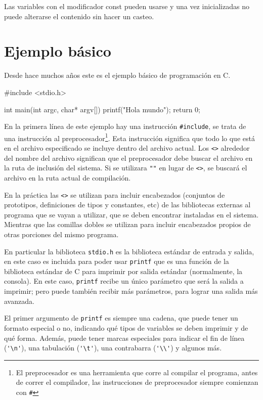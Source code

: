 Las variables con el modificador const pueden usarse y una vez inicializadas
no puede alterarse el contenido sin hacer un casteo.

\section{Ejemplo básico}

Desde hace muchos años este es el ejemplo básico de programación en C.

\begin{codigo-c}
#include <stdio.h>

int main(int argc, char* argv[])
{
    printf("Hola mundo\n");
    return 0;
}
\end{codigo-c}

En la primera línea de este ejemplo hay una instrucción \lstinline!#include!,
se trata de una instrucción al preprocesador\footnote{El preprocesador es una
herramienta que corre al compilar el programa, antes de correr el compilador,
las instrucciones de preprocesador siempre comienzan con \lstinline!#!}.
Esta instrucción significa que todo lo que está en el archivo especificado se
incluye dentro del archivo actual. Los \lstinline!<>! alrededor del nombre del
archivo significan que el preprocesador debe buscar el archivo en la ruta de
inclusión del sistema.  Si se utilizara \lstinline!""! en lugar de
\lstinline!<>!, se buscará el archivo en la ruta actual de compilación.

En la práctica las \lstinline!<>! se utilizan para incluir encabezados
(conjuntos de prototipos, definiciones de tipos y constantes, etc) de las
bibliotecas externas al programa que se vayan a utilizar, que se deben
encontrar instaladas en el sistema. Mientras que las comillas dobles se
utilizan para incluir encabezados propios de otras porciones del mismo
programa.

En particular la biblioteca \lstinline!stdio.h! es la biblioteca estándar de
entrada y salida, en este caso es incluida para poder usar \lstinline!printf!
que es una función de la biblioteca estándar de C para imprimir por salida
estándar (normalmente, la consola).  En este caso, \lstinline!printf! recibe
un único parámetro que será la salida a imprimir; pero puede también recibir
más parámetros, para lograr una salida más avanzada.

El primer argumento de \lstinline!printf! es siempre una cadena, que puede
tener un formato especial o no, indicando qué tipos de variables se deben
imprimir y de qué forma.  Además, puede tener marcas especiales para indicar
el fin de línea (\verb!'\n'!), una tabulación (\verb!'\t'!), una contrabarra
(\verb!'\\'!) y algunos más.

